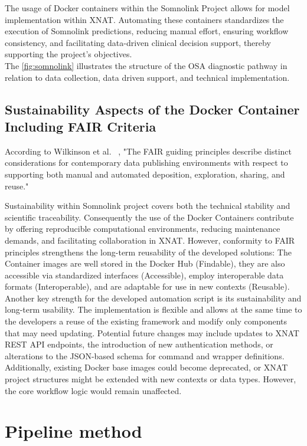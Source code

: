 The usage of Docker containers within the Somnolink Project allows for model implementation within XNAT. Automating these containers standardizes the execution of Somnolink predictions, reducing manual effort, ensuring workflow consistency, and facilitating data-driven clinical decision support, thereby supporting the project's objectives.\\
The \autoref{fig:somnolink} illustrates the structure of the OSA diagnostic pathway in relation to data collection, data driven support, and technical implementation.
\subsection{Sustainability Aspects of the Docker Container Including FAIR Criteria}
According to Wilkinson et al. ~\cite{FAIR}, "The FAIR guiding principles describe distinct considerations for contemporary data publishing environments with respect to supporting both manual and automated deposition, exploration, sharing, and reuse."


Sustainability within Somnolink project covers both the technical stability and scientific traceability. Consequently the use of the Docker Containers contribute by offering reproducible computational environments, reducing maintenance demands, and facilitating collaboration in XNAT. However, conformity to FAIR principles strengthens the long-term reusability of the developed solutions: The Container images are well stored in the Docker Hub (Findable), they are also accessible via standardized interfaces (Accessible), employ interoperable data formats (Interoperable), and are adaptable for use in new contexts (Reusable). 
Another key strength for the developed automation script is its sustainability and long-term usability. The implementation is flexible and allows at the same time to the developers a reuse of the existing framework and modify only components that may need updating. Potential future changes may include updates to XNAT REST API endpoints, the introduction of new authentication methods, or alterations to the JSON-based schema for command and wrapper definitions. Additionally, existing Docker base images could become deprecated, or XNAT project structures might be extended with new contexts or data types. However, the core workflow logic would remain unaffected.

\section{Pipeline method}
